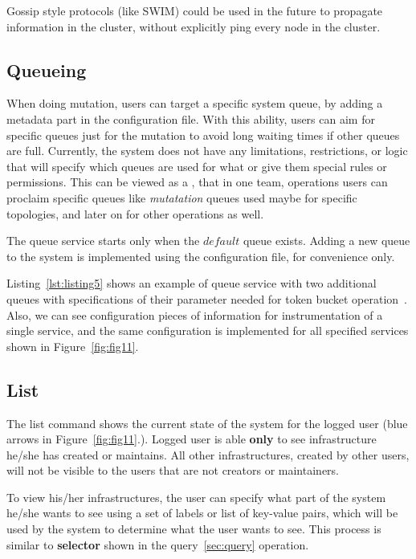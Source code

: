 Gossip style protocols (like SWIM) could be used in the future to propagate information in the cluster, without explicitly ping every node in the cluster.
%
%
\subsection{Queueing}\label{sec:queueing}
%
When doing mutation, users can target a specific system queue, by adding a metadata part in the configuration file. With this ability, users can aim for specific queues just for the mutation to avoid long waiting times if other queues are full. Currently, the system does not have any limitations, restrictions, or logic that will specify which queues are used for what or give them special rules or permissions. This can be viewed as a , that in one team, operations users can proclaim specific queues like \textit{mutatation} queues used maybe for specific topologies, and later on for other operations as well.

The queue service starts only when the $default$ queue exists. Adding a new queue to the system is implemented using the configuration file, for convenience only. 

Listing~\ref{lst:listing5} shows an example of queue service with two additional queues with specifications of their parameter needed for token bucket operation~\cite{MathewsKG17}. Also, we can see configuration pieces of information for instrumentation of a single service, and the same configuration is implemented for all specified services shown in Figure~\ref{fig:fig11}.


%
%
\subsection{List}\label{sec:list} 
% 
The list command shows the current state of the system for the logged user (blue arrows in Figure~\ref{fig:fig11}.). Logged user is able \textbf{only} to see infrastructure he/she has created or maintains. All other infrastructures, created by other users, will not be visible to the users that are not creators or maintainers.

To view his/her infrastructures, the user can specify what part of the system he/she wants to see using a set of labels or list of key-value pairs, which will be used by the system to determine what the user wants to see. This process is similar to \textbf{selector} shown in the query~\ref{sec:query} operation. 

